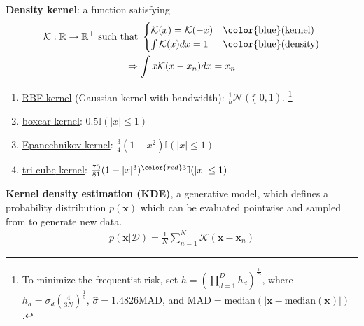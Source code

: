 \textbf{Density kernel}: a function satisfying 
\begin{gather}
    \mathcal{K}:\mathbb{R}\to\mathbb{R}^+~\text{such that}~
    \begin{cases}
        \mathcal{K}(x)=\mathcal{K}(-x) & \text{\color{blue}(kernel)} \\
        \int{\mathcal{K}(x)}dx=1 & \text{\color{blue}(density)}
    \end{cases}\\
    \Rightarrow \int{x\mathcal{K}(x-x_n)}dx=x_n
\end{gather}
\begin{enumerate}[{(1)}]
    \item \uline{RBF kernel} (Gaussian kernel with bandwidth): $\frac{1}{h}\mathcal{N}(\frac{x}{h}|0,1)$.
    \footnote{To minimize the frequentist risk, set $h = \left(\prod_{d=1}^Dh_d\right)^{\frac{1}{D}}$, 
    where $h_d = \sigma_d\left(\frac{4}{3N}\right)^\frac{1}{5}$, $\hat{\sigma} = 1.4826\mathrm{MAD}$, 
    and $\mathrm{MAD} = \mathrm{median}(|\bm{x}-\mathrm{median}(\bm{x})|)$.}
    \item \uline{boxcar kernel}: $0.5\mathbb{I}(|x|\leq 1)$
    \item \uline{Epanechnikov kernel}: $\frac{3}{4}(1-x^2)\mathbb{I}(|x|\leq 1)$
    \item \uline{tri-{\color{red}cube} kernel}: $\frac{70}{81}(1-|x|^3)^{\color{red}3}\mathbb{I}(|x|\leq 1)$
\end{enumerate}


\textbf{Kernel density estimation (KDE)}, a generative model, which defines a probability distribution $p(\bm{x})$
which can be evaluated pointwise and sampled from to generate new data.
\begin{gather}
    p(\bm{x}|\mathcal{D}) = \frac{1}{N}\sum_{n=1}^N\mathcal{K}(\bm{x}-\bm{x}_n)
\end{gather}

